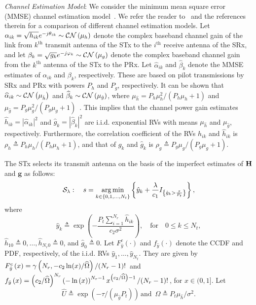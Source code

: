 \documentclass[12pt,draftcls,peerreview,onecolumn]{IEEEtran}
\newcommand{\cbrac}[1]{\left\{{#1}\right\}}
\newcommand{\indic}[1]{I_{\cbrac{#1}}}
\newcommand{\CN}{{\cal CN}}
\newcommand{\define}{\triangleq}
\newcommand{\mtx}[1]{{\bf #1}} %
\DeclareMathOperator*{\argmin}{arg\,min}
\newcommand{\nx}{{0}}
\newcommand{\lam}{\lambda}
\newcommand{\lamstar}{\lam^{*}}
\newcommand{\mug}{{\mu_{g}}}
\newcommand{\muh}{{\mu_{h}}}
\newcommand{\Nt}{{N_t}}
\newcommand{\Nr}{{N_r}}
\newcommand{\Pt}{{P_t}}
\newcommand{\such}{h}
\newcommand{\puch}{g}
\newcommand{\hk}[1]{{\such_{#1}}}
\newcommand{\gk}[1]{{\puch_{#1}}}
\newcommand{\g}{\mathbf{\puch}}
\newcommand{\noisevar}{\sigma^2}
\newcommand{\outmax}{O_{\text{max}}}
\newcommand{\itau}{\tau}
\newcommand{\cone}{c_{1}}
\newcommand{\ctwo}{c_{2}}
\newcommand{\out}{O}
\newcommand{\taubypt}{\frac{\itau}{\Pt}}
\newcommand{\gkhatgrtaubypt}[1]{{\gkhat{#1}}>\taubypt}
\newcommand{\ghatindic}[1]{\indic{\gkhatgrtaubypt{#1}}}
\newcommand{\lambym}{\frac{\lam}{\cone}}
\newcommand{\ykhatplusgkhat}[1]{ \ykhat{#1} + \lambym\ghatindic{#1}}
\newcommand{\snr}{\Omega}
\newcommand{\un}{U}
\newcommand{\allopts}{\left\{\nx,1,\ldots,\Nt\right\}}
\newcommand{\suchph}{\theta}
\newcommand{\puchph}{\varphi}
\newcommand{\Hmx}{\mtx{H}}
\newcommand{\ith}{i^{\text{th}}}
\newcommand{\kth}{k^{\text{th}}}
\newcommand{\callamrule}{{\cal S_{{\lam}}}}
\newcommand{\outlam}{\out_{\lam}}
\newcommand{\sug}{\alpha}
\newcommand{\pug}{\beta}
\newcommand{\sugain}[1]{\sug_{#1}}
\newcommand{\pugain}[1]{\pug_{#1}}
\newcommand{\sugainhat}[1]{\widehat{\sug}_{#1}}
\newcommand{\pugainhat}[1]{\widehat{\pug}_{#1}}
\newcommand{\unhat}{\widehat{\un}}
\newcommand{\snrhat}{\widehat{\snr}}
\newcommand{\gpilotpower}{P_g}
\newcommand{\hpilotpower}{P_h}
\newcommand{\hhat}{\hat{\such}}
\newcommand{\ghat}{\hat{\puch}}
\newcommand{\yhat}{\hat{y}}
\newcommand{\hkhat}[1]{\hhat_{#1}}
\newcommand{\gkhat}[1]{\ghat_{#1}}
\newcommand{\ykhat}[1]{\hat{y}_{#1}}
\newcommand{\muhhat}{\mu_{\hhat}}
\newcommand{\mughat}{\mu_{\ghat}}
\newcommand{\ccdfghatinline}{\exp\left( {-{\itau}/{\left( \mughat\Pt\right) }}\right) }
\newcommand{\rhog}{\rho_g}
\newcommand{\rhoh}{\rho_h}
\begin{document}
{\em Channel Estimation Model}: We consider the minimum mean square error (MMSE) channel estimation model~\cite{Sboui_2013_TWC,Kashyap_2014_TCOM,musavian_2009_tcom}. We refer the reader to~\cite{Zhang_2017_tcom,Kashyap_2015_wicomlet} and the references therein for a comparison of different channel estimation models.  Let $ \sugain{ik}= \sqrt{\hk{ik}}e^{-j\suchph_{ik}}\sim\CN\left(\muh\right) $ denote the complex baseband channel gain of the link from $\kth$ transmit antenna of the STx to the $\ith$ receive antenna of the SRx, and let $\pugain{k} = \sqrt{\gk{k}}e^{-j\puchph_{k}}\sim\CN\left(\mug\right)$ denote the complex baseband channel gain from the $\kth$ antenna of the STx to the PRx. Let $\sugainhat{ik}$ and $\pugainhat{k}$ denote the MMSE estimates of $\sugain{ik}$ and $\pugain{k}$, respectively. These are based on pilot transmissions by SRx and PRx with powers $\hpilotpower$ and $\gpilotpower$, respectively.  It can be shown that  $\sugainhat{ik}\sim\CN\left(\muhhat \right)$ and $\pugainhat{k}\sim \CN\left(\mughat\right)$, where  $\muhhat ={\hpilotpower\mu^2_{\such}}/{\left( \hpilotpower\muh+1\right)}$ and $\mughat = {\gpilotpower\mu^2_{\puch}}/{\left( \gpilotpower\mug+1\right)}$~\cite{Kashyap_2014_TCOM}.  
This implies that the channel power gain estimates $\hkhat{ik}=|\sugainhat{ik}|^2$ and $\gkhat{k}=|\pugainhat{k}|^2$ are i.i.d. exponential RVs with means $\muhhat$ and $\mughat$, respectively. Furthermore, the correlation coefficient  of the RVs $\hk{ik}$ and $\hkhat{ik}$ is $\rhoh\define{\hpilotpower\muh}/{\left( \hpilotpower\muh + 1\right) }$, and that of $\gk{k}$ and $\gkhat{k}$ is $\rhog \define{\gpilotpower\mug}/{\left( \gpilotpower\mug + 1\right) }$. 

The STx selects its transmit antenna on the basis of the imperfect estimates of $\Hmx$ and $\g$ as follows:  
\begin{equation}
\callamrule:\quad s=\argmin\limits_{k\in\allopts} \left\{ \ykhatplusgkhat{k} \right\},
\label{eq:shat}
\end{equation}
where 
\begin{equation}
\ykhat{k} \define  \exp\left({- \frac{\Pt\sum_{i=1}^{\Nr}\hkhat{ik}}{\ctwo\noisevar} }\right), \quad \text{for} \quad 0\leq k \leq\Nt,
\label{eq:yihat_def}
\end{equation}
$\hkhat{1\nx} \define 0,\ldots,\hkhat{\Nr\nx} \define 0$, and $\gkhat{\nx} \define 0$. Let $F_{\yhat}^{c}(\cdot)$ and $f_{\yhat}(\cdot)$ denote the CCDF and PDF, respectively, of the i.i.d. RVs $\ykhat{1},\dots,\ykhat{\Nt}$. They are given by $F_{\yhat}^{c}\left(x\right) =  {\gamma\left(\Nr,-\ctwo\ln(x)/\snrhat\right)} \left/ {(\Nr-1)!}\right.$ and $f_{\yhat}\left(x\right) = { \left( \ctwo/\snrhat \right)^{\Nr} \left(-\ln\left(x \right)\right)^{\Nr-1} x^{\left( \ctwo/\snrhat \right) - 1}}\left/{(\Nr-1)!}\right.$, for $x \in (0,1]$.  Let 
\begin{equation}
\unhat\define\ccdfghatinline\, \text{and}\,\,\, \snrhat\define{\Pt\muhhat}/{\noisevar}.  
\end{equation}
\end{document}
